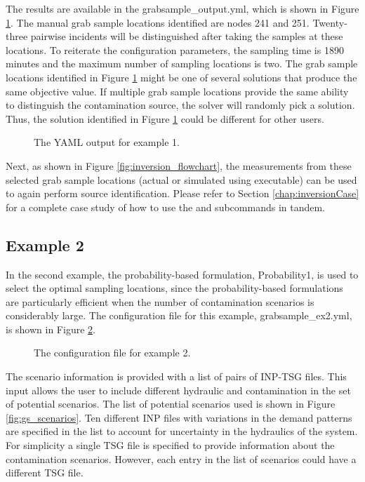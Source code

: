 The results are available in the {\outputprefix}grabsample\_output.yml, which
is shown in Figure \ref{fig:sampling_ex1_re}. The manual grab sample
locations identified are nodes 241 and 251. Twenty-three pairwise
incidents will be distinguished after taking the samples at these
locations. To reiterate the configuration parameters, the sampling
time is 1890 minutes and the maximum number of sampling locations is
two. The grab sample locations identified in Figure \ref{fig:sampling_ex1_re} 
might be one of several solutions that produce the same objective value. If 
multiple grab sample locations provide the same ability to distinguish the 
contamination source, the solver will randomly pick a solution. Thus, the solution 
identified in Figure \ref{fig:sampling_ex1_re} could be different for other users. 

\begin{figure}[H]
  \caption{The  YAML output for example 1.}
  \label{fig:sampling_ex1_re}
\end{figure}

Next, as shown in Figure \ref{fig:inversion_flowchart}, the
measurements from these selected grab sample locations (actual or
simulated using  executable) can be used to again
perform source identification. Please refer to
Section \ref{chap:inversionCase} for a complete case study of how to
use the  and  subcommands in tandem.
 
\subsection{Example 2}

In the second example, the probability-based formulation, Probability1, is used to select the optimal sampling locations, since the probability-based formulations are particularly efficient when the number of contamination scenarios is considerably large. The configuration file for this example, grabsample\_ex2.yml, is shown in
Figure \ref{fig:sampling_ex2}. 

\begin{figure}[H]
  \caption{The  configuration file for example 2.}
  \label{fig:sampling_ex2}
\end{figure}

The scenario information is provided with a list of pairs of INP-TSG files. This input allows the user to include different hydraulic and contamination in the set of potential scenarios. The list of potential scenarios used is shown in Figure \ref{fig:gs_scenarios}. Ten different INP files with variations in the demand patterns are specified in the list to account for uncertainty in the hydraulics of the system. For simplicity a single TSG file is specified to provide information about the contamination scenarios. However, each entry in the list of scenarios could have a different TSG file.


